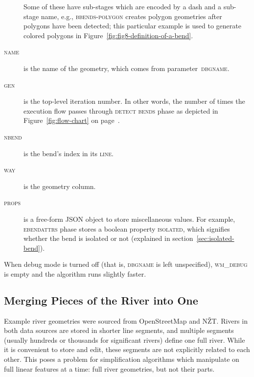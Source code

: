 \documentclass[a4paper]{article}
\newcommand{\onpage}[1]{\ref{#1} on page~\pageref{#1}}
\begin{document}
\begin{description}
        Some of these have sub-stages which are encoded by a dash and a
        sub-stage name, e.g., \textsc{bbends-polygon} creates polygon
        geometries after polygons have been detected; this particular example
        is used to generate colored polygons in
        Figure~\ref{fig:fig8-definition-of-a-bend}.

    \item[\normalfont\textsc{name}] is the name of the geometry, which comes from
        parameter~\textsc{dbgname}.

    \item[\normalfont\textsc{gen}] is the top-level iteration number. In other
        words, the number of times the execution flow passes through
        \textsc{detect bends} phase as depicted in
        Figure~\onpage{fig:flow-chart}.

    \item[\normalfont\textsc{nbend}] is the bend's index in its \textsc{line}.

    \item[\normalfont\textsc{way}] is the geometry column.

    \item[\normalfont\textsc{props}] is a free-form JSON object to store
        miscellaneous values. For example, \textsc{ebendattrs} phase stores a
        boolean property \textsc{isolated}, which signifies whether the bend is
        isolated or not (explained in section~\ref{sec:isolated-bend}).

\end{description}

When debug mode is turned off (that is, \textsc{dbgname} is left unspecified),
\textsc{wm\_debug} is empty and the algorithm runs slightly faster.

\subsection{Merging Pieces of the River into One}

Example river geometries were sourced from OpenStreetMap\cite{openstreetmap}
and NŽT\cite{nzt}. Rivers in both data sources are stored in shorter line
segments, and multiple segments (usually hundreds or thousands for significant
rivers) define one full river. While it is convenient to store and edit, these
segments are not explicitly related to each other. This poses a problem for
simplification algorithms which manipulate on full linear features at a time:
full river geometries, but not their parts.
\end{document}
